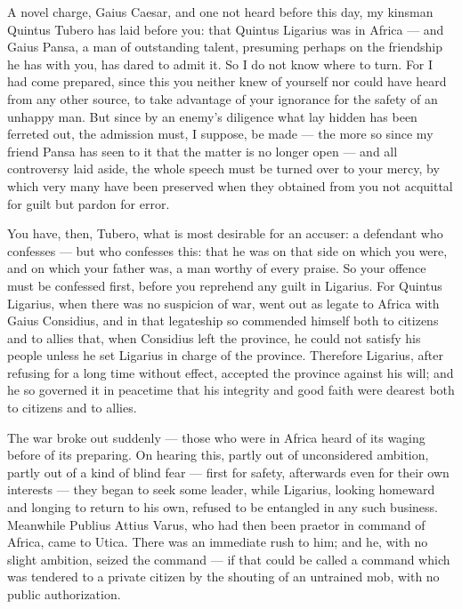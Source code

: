 
 A novel charge, Gaius Caesar, and one not heard before this day, my kinsman Quintus Tubero has laid before you: that Quintus Ligarius was in Africa --- and Gaius Pansa, a man of outstanding talent, presuming perhaps on the friendship he has with you, has dared to admit it. So I do not know where to turn. For I had come prepared, since this you neither knew of yourself nor could have heard from any other source, to take advantage of your ignorance for the safety of an unhappy man. But since by an enemy's diligence what lay hidden has been ferreted out, the admission must, I suppose, be made --- the more so since my friend Pansa has seen to it that the matter is no longer open --- and all controversy laid aside, the whole speech must be turned over to your mercy, by which very many have been preserved when they obtained from you not acquittal for guilt but pardon for error.

 You have, then, Tubero, what is most desirable for an accuser: a defendant who confesses --- but who confesses this: that he was on that side on which you were, and on which your father was, a man worthy of every praise. So your offence must be confessed first, before you reprehend any guilt in Ligarius. For Quintus Ligarius, when there was no suspicion of war, went out as legate to Africa with Gaius Considius, and in that legateship so commended himself both to citizens and to allies that, when Considius left the province, he could not satisfy his people unless he set Ligarius in charge of the province. Therefore Ligarius, after refusing for a long time without effect, accepted the province against his will; and he so governed it in peacetime that his integrity and good faith were dearest both to citizens and to allies.

 The war broke out suddenly --- those who were in Africa heard of its waging before of its preparing. On hearing this, partly out of unconsidered ambition, partly out of a kind of blind fear --- first for safety, afterwards even for their own interests --- they began to seek some leader, while Ligarius, looking homeward and longing to return to his own, refused to be entangled in any such business. Meanwhile Publius Attius Varus, who had then been praetor in command of Africa, came to Utica. There was an immediate rush to him; and he, with no slight ambition, seized the command --- if that could be called a command which was tendered to a private citizen by the shouting of an untrained mob, with no public authorization.

